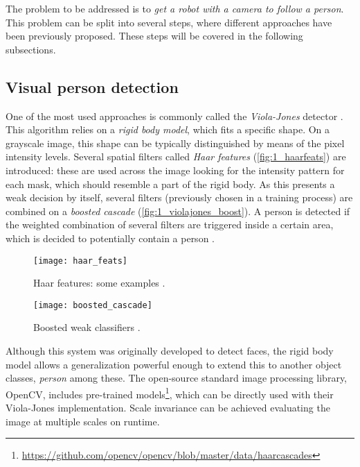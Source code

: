 	The problem to be addressed is to \textit{get a robot with a camera to follow a person}. This problem can be split into several steps, where different approaches have been previously proposed. These steps will be covered in the following subsections.
	
\subsection{Visual person detection}


One of the most used approaches is commonly called the \textit{Viola-Jones} detector \cite{violajones}. This algorithm relies on a \textit{rigid body model}, which fits a specific shape. On a grayscale image, this shape can be typically distinguished by means of the pixel intensity levels. Several spatial filters called \textit{Haar features} (\autoref{fig:1_haarfeats}) are introduced: these are used across the image looking for the intensity pattern for each mask, which should resemble a part of the rigid body. As this presents a weak decision by itself, several filters (previously chosen in a training process) are combined on a \textit{boosted cascade} (\autoref{fig:1_violajones_boost}). A person is detected if the weighted combination of several filters are triggered inside a certain area, which is decided to potentially contain a person \cite{diapos_cv_clasif}.

\begin{figure}[h]
	\centering
	\texttt{[image: haar\_feats]}
	\caption{Haar features: some examples \cite{diapos_cv_clasif}.}
	\label{fig:1_haarfeats}
\end{figure}

\begin{figure}[h]
	\centering
	\texttt{[image: boosted\_cascade]}
	\caption{Boosted weak classifiers \cite{diapos_cv_clasif}.}
	\label{fig:1_violajones_boost}
\end{figure}

Although this system was originally developed to detect faces, the rigid body model allows a generalization powerful enough to extend this to another object classes, \textit{person} among these. The open-source standard image processing library, OpenCV, includes pre-trained models\footnote{\url{https://github.com/opencv/opencv/blob/master/data/haarcascades}}, which can be directly used with their Viola-Jones implementation. Scale invariance can be achieved evaluating the image at multiple scales on runtime.


